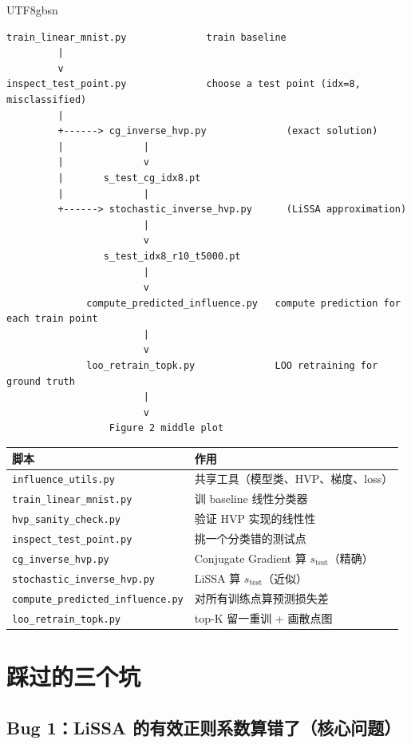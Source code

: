 \documentclass[a4paper,11pt]{article}
\begin{document}
\begin{CJK*}{UTF8}{gbsn}
\begin{Verbatim}[frame=single, fontsize=\small]
train_linear_mnist.py              train baseline
         |
         v
inspect_test_point.py              choose a test point (idx=8, misclassified)
         |
         +------> cg_inverse_hvp.py              (exact solution)
         |              |
         |              v
         |       s_test_cg_idx8.pt
         |              |
         +------> stochastic_inverse_hvp.py      (LiSSA approximation)
                        |
                        v
                 s_test_idx8_r10_t5000.pt
                        |
                        v
              compute_predicted_influence.py   compute prediction for each train point
                        |
                        v
              loo_retrain_topk.py              LOO retraining for ground truth
                        |
                        v
                  Figure 2 middle plot
\end{Verbatim}

\begin{table}[h]
\centering
\small
\begin{tabular}{lp{8.5cm}}
\toprule
脚本 & 作用 \\
\midrule
\texttt{influence\_utils.py} & 共享工具（模型类、HVP、梯度、loss）\\
\texttt{train\_linear\_mnist.py} & 训 baseline 线性分类器 \\
\texttt{hvp\_sanity\_check.py} & 验证 HVP 实现的线性性 \\
\texttt{inspect\_test\_point.py} & 挑一个分类错的测试点 \\
\texttt{cg\_inverse\_hvp.py} & Conjugate Gradient 算 $s_{\text{test}}$（精确）\\
\texttt{stochastic\_inverse\_hvp.py} & LiSSA 算 $s_{\text{test}}$（近似）\\
\texttt{compute\_predicted\_influence.py} & 对所有训练点算预测损失差 \\
\texttt{loo\_retrain\_topk.py} & top-K 留一重训 + 画散点图 \\
\bottomrule
\end{tabular}
\end{table}

\section{踩过的三个坑}

\subsection*{Bug 1：LiSSA 的有效正则系数算错了（核心问题）}


\end{CJK*}
\end{document}
